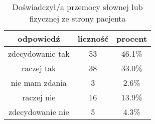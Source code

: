 \begin{table}[H]
\caption{Doświadczył/a przemocy słownej lub fizycznej ze strony pacjenta}
\centering
\begin{tabular}{ | c | c | c |}
\hline
odpowiedź & liczność & procent\\
\hline
zdecydowanie tak  &  53  & 46.1\% \\
\hline
raczej tak  &  38  & 33.0\% \\
\hline
nie mam zdania  &  3  & 2.6\% \\
\hline
raczej nie  &  16  & 13.9\% \\
\hline
zdecydowanie nie  &  5  & 4.3\% \\
\hline
\end{tabular}
\label{tab:Q16}
\end{table}

